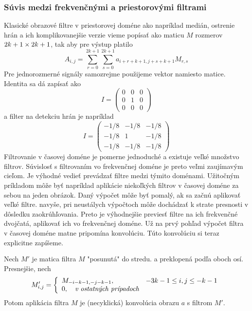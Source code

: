 \subsubsection{Súvis medzi frekvenčnými a priestorovými filtrami}
Klasické obrazové filtre v priestorovej doméne ako napríklad medián, 
ostrenie hrán a
ich komplikovanejšie verzie vieme popísať ako maticu $M$ rozmerov $2k+1 \times
2k+1$, tak aby pre výstup platilo 
\begin{equation}
    A_{i,j} = \sum_{r=0}^{2k+1} \sum_{s=0}^{2k+1} a_{i+r+k+1, j+s+k+1} M_{r,s}
\end{equation}
Pre jednorozmerné signály samozrejme použijeme vektor namiesto matice.
Identita sa dá zapísať ako 
\begin{equation}
    I = \begin{pmatrix}
            0 & 0 & 0 \\
            0 & 1 & 0 \\
            0 & 0 & 0
        \end{pmatrix}
\end{equation}
a filter na detekciu hrán je napríklad
\begin{equation}
    I = \begin{pmatrix}
            -1/8 & -1/8 & -1/8 \\
            -1/8 & 1 & -1/8 \\
            -1/8 & -1/8 & -1/8
        \end{pmatrix}
\end{equation}
Filtrovanie v časovej doméne je pomerne jednoduché a existuje veľké
množstvo filtrov. Súvislosť s filtrovaním vo frekvenčnej doméne je
preto veľmi zaujímavým cieľom. Je výhodné vedieť prevádzať filtre
medzi týmito doménami. Užitočným príkladom môže byť napríklad
aplikácie niekoľkých filtrov v časovej doméne za sebou na jeden obrázok.
Daný výpočet môže byť pomalý, ak sa začnú aplikovať veľké filtre.
navyše, pri neustálych výpočtoch môže dochádzať k strate presnosti v
dôsledku zaokrúhľovania. Preto je výhodnejšie previesť filtre na ich
frekvenčné dvojčatá, aplikovať ich vo frekvenčnej doméne.
Už na prvý pohľad výpočet filtra v časovej doméne matne pripomína
konvolúciu. Túto konvolúciu si teraz explicitne zapíšeme.
\begin{lema}
    Nech $M'$ je matica filtra $M$ "posunutá" do stredu. a preklopená
    podľa oboch osí. Presnejšie, nech 
    \begin{equation}
        M'_{i,j} = \left\{
            \begin{array}{l l}
               M_{-i-k-1,-j-k-1}, \quad &  -3k-1 \le i,j \le -k-1 \\
               0, \quad \textit{v ostatných prípadoch}
            \end{array}
            \right.
    \end{equation}
    Potom aplikácia filtra $M$ je (necyklická) konvolúcia obrazu
    $a$ s filtrom $M'$.
    \label{lema:filter_konvolucia}
\end{lema}
